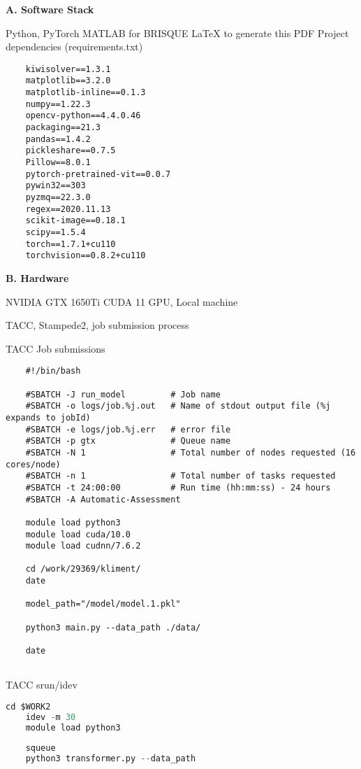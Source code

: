 \textbf{A. Software Stack}

Python, PyTorch
MATLAB for BRISQUE
LaTeX to generate this PDF
Project dependencies (requirements.txt)

\scriptsize
\begin{verbatim}
    kiwisolver==1.3.1
    matplotlib==3.2.0
    matplotlib-inline==0.1.3
    numpy==1.22.3
    opencv-python==4.4.0.46
    packaging==21.3
    pandas==1.4.2
    pickleshare==0.7.5
    Pillow==8.0.1
    pytorch-pretrained-vit==0.0.7
    pywin32==303
    pyzmq==22.3.0
    regex==2020.11.13
    scikit-image==0.18.1
    scipy==1.5.4
    torch==1.7.1+cu110
    torchvision==0.8.2+cu110
\end{verbatim}
\normalsize	

\textbf{B. Hardware}

NVIDIA GTX 1650Ti
CUDA 11
GPU, Local machine

TACC, Stampede2, job submission process

TACC Job submissions

\scriptsize
\begin{verbatim}
    #!/bin/bash

    #SBATCH -J run_model         # Job name
    #SBATCH -o logs/job.%j.out   # Name of stdout output file (%j expands to jobId)
    #SBATCH -e logs/job.%j.err   # error file
    #SBATCH -p gtx               # Queue name
    #SBATCH -N 1                 # Total number of nodes requested (16 cores/node)
    #SBATCH -n 1                 # Total number of tasks requested
    #SBATCH -t 24:00:00          # Run time (hh:mm:ss) - 24 hours
    #SBATCH -A Automatic-Assessment
    
    module load python3
    module load cuda/10.0
    module load cudnn/7.6.2
    
    cd /work/29369/kliment/
    date
    
    model_path="/model/model.1.pkl"
    
    python3 main.py --data_path ./data/ 
    
    date
    
\end{verbatim}
\normalsize	

TACC srun/idev


\small
\begin{lstlisting}[keywordstyle=\color{blue},language=Python]
    cd $WORK2
    idev -m 30
    module load python3
    
    squeue
    python3 transformer.py --data_path 
\end{lstlisting}
\normalsize	